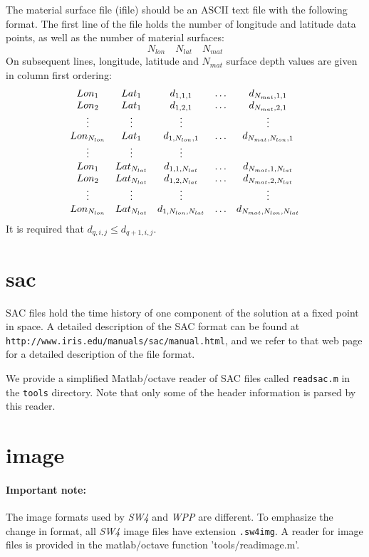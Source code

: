 \documentclass[11pt]{report}
\begin{document}
The material surface file (ifile) should be an ASCII text file with the following format. The first line of the
file holds the number of longitude and latitude data points, as well as the number of material
surfaces:
\[
N_{lon}\quad N_{lat}\quad N_{mat}
\]
On subsequent lines, longitude, latitude and $N_{mat}$ surface depth values are given in column
first ordering:
\[
\begin{array}{c c c c c}
Lon_1 & Lat_1          & d_{1,1,1} & \ldots & d_{N_{mat},1,1}\\
Lon_2& Lat_1           & d_{1,2,1} & \ldots & d_{N_{mat},2,1}\\
\vdots&\vdots&\vdots & & \vdots\\
Lon_{N_{lon}}& Lat_1      & d_{1,N_{lon},1} & \ldots & d_{N_{mat},N_{lon},1}\\
\vdots&\vdots&\vdots\\
Lon_1 & Lat_{N_{lat}}     & d_{1,1,N_{lat}} & \ldots & d_{N_{mat},1,N_{lat}}\\
Lon_2& Lat_{N_{lat}}      & d_{1,2,N_{lat}} & \ldots & d_{N_{mat},2,N_{lat}}\\
\vdots&\vdots&\vdots & & \vdots\\
Lon_{N_{lon}}& Lat_{N_{lat}} & d_{1,N_{lon},N_{lat}} & \ldots & d_{N_{mat},N_{lon},N_{lat}}
\end{array}
\]
It is required that $d_{q,i,j} \leq d_{q+1,i,j}$.

\section{sac}\label{sec:sac-format}

SAC files hold the time history of one component of the solution at a fixed point in space.  A
detailed description of the SAC format can be found at {\tt
http://www.iris.edu/manuals/sac/manual.html}, and we refer to that web page for a detailed
description of the file format.

We provide a simplified Matlab/octave reader of SAC files called {\tt readsac.m} in the {\tt tools}
directory. Note that only some of the header information is parsed by this reader.

\section{image}\label{sec:image-format}

\paragraph{Important note:} The image formats used by \emph{SW4} and \emph{WPP} are different. To emphasize
the change in format, all \emph{SW4} image files have extension {\tt .sw4img}. A reader for image
files is provided in the matlab/octave function 'tools/readimage.m'.
\end{document}
